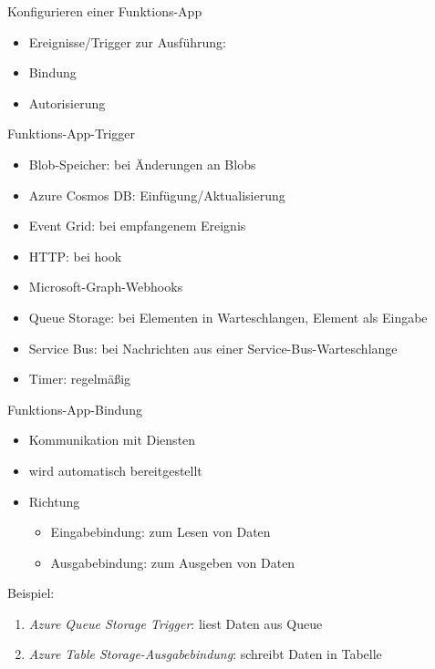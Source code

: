 \begin{flashcard}[Definition]{Konfigurieren einer Funktions-App}
    \begin{itemize}
        \item Ereignisse/Trigger zur Ausführung:
        \item Bindung
        \item Autorisierung
    \end{itemize}
\end{flashcard}

\begin{flashcard}[Definition]{Funktions-App-Trigger}
    \begin{itemize}
        \item Blob-Speicher: bei Änderungen an Blobs
        \item Azure Cosmos DB: Einfügung/Aktualisierung
        \item Event Grid: bei empfangenem Ereignis
        \item HTTP: bei hook
        \item Microsoft-Graph-Webhooks
        \item Queue Storage: bei Elementen in Warteschlangen, Element als Eingabe
        \item Service Bus: bei Nachrichten aus einer Service-Bus-Warteschlange
        \item Timer: regelmäßig
    \end{itemize}
\end{flashcard}

\begin{flashcard}[Definition]{Funktions-App-Bindung}
    \begin{itemize}
        \item Kommunikation mit Diensten
        \item wird automatisch bereitgestellt
        \item Richtung
        \begin{itemize}
            \item Eingabebindung: zum Lesen von Daten
            \item Ausgabebindung: zum Ausgeben von Daten
        \end{itemize}
    \end{itemize}
    Beispiel:
    \begin{enumerate}
        \item \emph{Azure Queue Storage Trigger}: liest Daten aus Queue
        \item \emph{Azure Table Storage-Ausgabebindung}: schreibt Daten in Tabelle
    \end{enumerate}

\end{flashcard}

